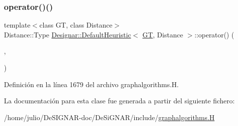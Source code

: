 \subsubsection{\texorpdfstring{operator()()}{operator()()}}
{\footnotesize\ttfamily template$<$class GT, class Distance$>$ \\
Distance\+::\+Type \hyperlink{class_designar_1_1_default_heuristic}{Designar\+::\+Default\+Heuristic}$<$ \hyperlink{demo-buildgraph_8_c_a3001c40d2c31ca87ed96cd7d1334a55e}{GT}, Distance $>$\+::operator() (\begin{DoxyParamCaption}\item[{typename \hyperlink{test-mtreenode_8_c_a17a24b0725f59987143c5faf63c4dc6f}{G\+T\+::\+Node} \&}]{,  }\item[{typename \hyperlink{test-mtreenode_8_c_a17a24b0725f59987143c5faf63c4dc6f}{G\+T\+::\+Node} \&}]{ }\end{DoxyParamCaption})\hspace{0.3cm}{\ttfamily [inline]}}



Definición en la línea 1679 del archivo graphalgorithms.\+H.



La documentación para esta clase fue generada a partir del siguiente fichero\+:\begin{DoxyCompactItemize}
\item 
/home/julio/\+De\+S\+I\+G\+N\+A\+R-\/doc/\+De\+Si\+G\+N\+A\+R/include/\hyperlink{graphalgorithms_8_h}{graphalgorithms.\+H}\end{DoxyCompactItemize}
